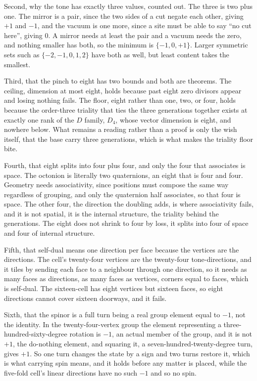 \documentclass{article}
\begin{document}
Second, why the tone has exactly three values, counted out. The three is two plus one. The
mirror is a pair, since the two sides of a cut negate each other, giving $+1$ and $-1$, and the
vacuum is one more, since a site must be able to say ``no cut here'', giving $0$. A mirror needs
at least the pair and a vacuum needs the zero, and nothing smaller has both, so the minimum is
$\{-1, 0, +1\}$. Larger symmetric sets such as $\{-2,-1,0,1,2\}$ have both as well, but least
content takes the smallest.

Third, that the pinch to eight has two bounds and both are theorems. The ceiling, dimension at
most eight, holds because past eight zero divisors appear and losing nothing fails. The floor,
eight rather than one, two, or four, holds because the order-three triality that ties the three
generations together exists at exactly one rank of the $D$ family, $D_4$, whose vector dimension
is eight, and nowhere below. What remains a reading rather than a proof is only the wish itself,
that the base carry three generations, which is what makes the triality floor bite.

Fourth, that eight splits into four plus four, and only the four that associates is space. The
octonion is literally two quaternions, an eight that is four and four. Geometry needs
associativity, since positions must compose the same way regardless of grouping, and only the
quaternion half associates, so that four is space. The other four, the direction the doubling
adds, is where associativity fails, and it is not spatial, it is the internal structure, the
triality behind the generations. The eight does not shrink to four by loss, it splits into four
of space and four of internal structure.

Fifth, that self-dual means one direction per face because the vertices are the directions. The
cell's twenty-four vertices are the twenty-four tone-directions, and it tiles by sending each
face to a neighbour through one direction, so it needs as many faces as directions, as many
faces as vertices, corners equal to faces, which is self-dual. The sixteen-cell has eight
vertices but sixteen faces, so eight directions cannot cover sixteen doorways, and it fails.

Sixth, that the spinor is a full turn being a real group element equal to $-1$, not the
identity. In the twenty-four-vertex group the element representing a three-hundred-sixty-degree
rotation is $-1$, an actual member of the group, and it is not $+1$, the do-nothing element, and
squaring it, a seven-hundred-twenty-degree turn, gives $+1$. So one turn changes the state by a
sign and two turns restore it, which is what carrying spin means, and it holds before any matter
is placed, while the five-fold cell's linear directions have no such $-1$ and so no spin.
\end{document}
